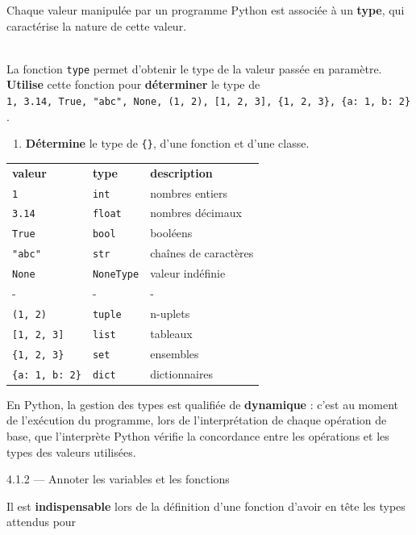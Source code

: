 \documentclass[a4paper,17pt]{extarticle}
\newenvironment{eleve}%
{\begin{activite}\color{noiramu}\\[-0.5cm]}
{\end{activite}}
\providecommand{\tightlist}{%
      \setlength{\itemsep}{0pt}\setlength{\parskip}{0pt}}
\begin{document}
    Chaque valeur manipulée par un programme Python est associée à un
\textbf{type}, qui caractérise la nature de cette valeur.
\begin{eleve}
    La fonction \texttt{type} permet d'obtenir le type de la valeur passée
en paramètre. \textbf{Utilise} cette fonction pour \textbf{déterminer}
le type de
\texttt{1,\ 3.14,\ True,\ "abc",\ None,\ (1,\ 2),\ {[}1,\ 2,\ 3{]},\ \{1,\ 2,\ 3\},\ \{\textquotesingle{}a\textquotesingle{}:\ 1,\ \textquotesingle{}b\textquotesingle{}:\ 2\}}.

\begin{enumerate}
\def\labelenumi{\arabic{enumi}.}
\setcounter{enumi}{1}
\tightlist
\item
  \textbf{Détermine} le type de \texttt{\{\}}, d'une fonction et d'une
  classe.
\end{enumerate}
        
        \end{eleve}\begin{reponse}
    \begin{longtable}[]{@{}lll@{}}
\toprule
\endhead
\textbf{valeur} & \textbf{type} & \textbf{description}\tabularnewline
\texttt{1} & \texttt{int} & nombres entiers\tabularnewline
\texttt{3.14} & \texttt{float} & nombres décimaux\tabularnewline
\texttt{True} & \texttt{bool} & booléens\tabularnewline
\texttt{"abc"} & \texttt{str} & chaînes de caractères\tabularnewline
\texttt{None} & \texttt{NoneType} & valeur indéfinie\tabularnewline
- & - & -\tabularnewline
\texttt{(1,\ 2)} & \texttt{tuple} & n-uplets\tabularnewline
\texttt{{[}1,\ 2,\ 3{]}} & \texttt{list} & tableaux\tabularnewline
\texttt{\{1,\ 2,\ 3\}} & \texttt{set} & ensembles\tabularnewline
\texttt{\{\textquotesingle{}a\textquotesingle{}:\ 1,\ \textquotesingle{}b\textquotesingle{}:\ 2\}}
& \texttt{dict} & dictionnaires\tabularnewline
\bottomrule
\end{longtable}

        \end{reponse}
    En Python, la gestion des types est qualifiée de \textbf{dynamique} :
c'est au moment de l'exécution du programme, lors de l'interprétation de
chaque opération de base, que l'interprète Python vérifie la concordance
entre les opérations et les types des valeurs utilisées.

    4.1.2 --- Annoter les variables et les fonctions

    Il est \textbf{indispensable} lors de la définition d'une fonction
d'avoir en tête les types attendus pour
\end{document}
